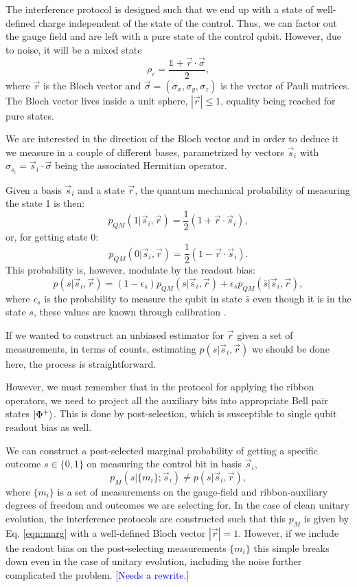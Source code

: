\documentclass[two column]{article}
\newcommand{\jovan}[1]{\textcolor{blue}{[#1]}}
\begin{document}
The interference protocol is designed such that we end up with a state of well-defined charge independent of the state of the control. Thus, we can factor out the gauge field and are left with a pure state of the control qubit. However, due to noise, it will be a mixed state \begin{equation}
    \rho_c = \frac{\mathbb{1} + \vec{r} \cdot \vec{\sigma}}{2},
\end{equation}
where $\vec{r}$ is the Bloch vector and $\vec{\sigma} = (\sigma_x, \sigma_y, \sigma_z)$ is the vector of Pauli matrices. The Bloch vector lives inside a unit sphere, $|\vec{r}|\leq 1$, equality being reached for pure states.

We are interested in the direction of the Bloch vector and in order to deduce it we measure in a couple of different bases, parametrized by vectors $\vec{s}_i$ with $\sigma_{s_i} = \vec{s}_i \cdot \vec{\sigma}$ being the associated Hermitian operator.

Given a basis $\vec{s}_i$ and a state $\vec{r}$, the quantum mechanical probability of measuring the state 1 is then: $$p_{QM}(1|\vec{s}_i, \vec{r}) = \frac{1}{2}(1+\vec{r}\cdot\vec{s}_i),$$ or, for getting state 0:
$$p_{QM}(0|\vec{s}_i, \vec{r}) = \frac{1}{2}(1-\vec{r}\cdot\vec{s}_i).$$
This probability is, however, modulate by the readout bias:
\begin{equation}
    p(s|\vec{s}_i, \vec{r}) = (1-\epsilon_s)p_{QM}(s|\vec{s}_i, \vec{r}) + \epsilon_{\bar{s}} p_{QM}(\bar{s}|\vec{s}_i, \vec{r}), \label{eqn:marg}
\end{equation}
where $\epsilon_s$ is the probability to measure the qubit in state $\bar{s}$ even though it is in the state $s$, these values are known through calibration \cite{}.

If we wanted to construct an unbiased estimator for $\vec{r}$ given a set of measurements, in terms of counts, estimating $p(s|\vec{s}_i, \vec{r})$ we should be done here, the process is straightforward.

However, we must remember that in the protocol for applying the ribbon operators, we need to project all the auxiliary bits into appropriate Bell pair states $\ket{\Phi^+}$.
This is done by post-selection, which is susceptible to single qubit readout bias as well.

We can construct a post-selected marginal probability of getting a specific outcome $s \in \{0, 1\}$ on measuring the control bit in basis $\vec{s}_i$, $$p_M(s |\{m_i\}; \vec{s}_i) \neq p(s|\vec{s}_i, \vec{r}) ,$$ where $\{m_i\}$ is a set of measurements on the gauge-field and ribbon-auxiliary degrees of freedom and outcomes we are selecting for.
In the case of clean unitary evolution, the interference protocols are constructed such that this $p_M$ is given by Eq. \ref{eqn:marg} with a well-defined Bloch vector $|\vec{r}| = 1$.
However, if we include the readout bias on the post-selecting measurements $\{m_i\}$ this simple breaks down even in the case of unitary evolution, including the noise further complicated the problem. \jovan{Needs a rewrite.}
\end{document}
